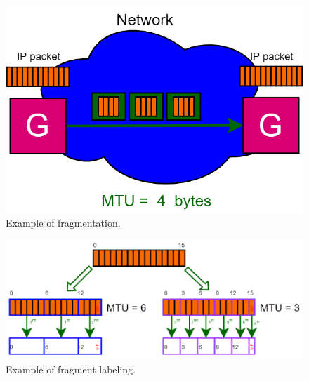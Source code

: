 \begin{figure}[h]
\centering
\includegraphics[scale=0.4]{Images/IP/fragmentation}
\caption{\footnotesize{Example of fragmentation.}}\label{fragmentation}
\end{figure}
\begin{figure}[h]
\centering
\includegraphics[scale=0.4]{Images/IP/label_fragment}
\caption{\footnotesize{Example of fragment labeling.}}\label{label_fragment}
\end{figure}

